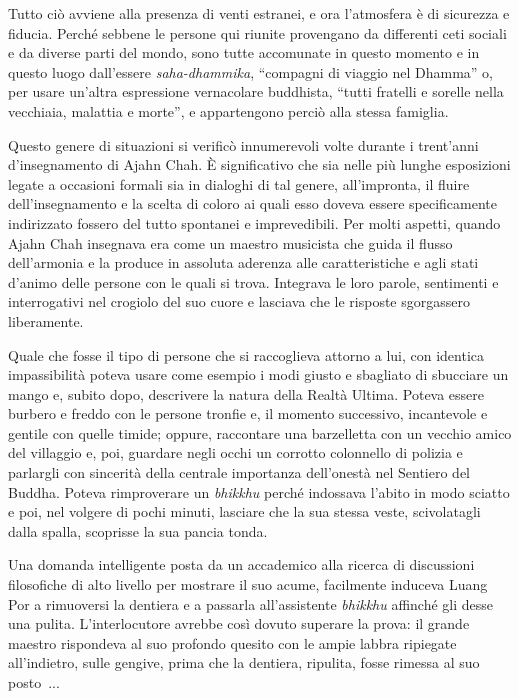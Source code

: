 Tutto ciò avviene alla presenza di venti estranei, e ora l'atmosfera è
di sicurezza e fiducia. Perché sebbene le persone qui riunite provengano
da differenti ceti sociali e da diverse parti del mondo, sono tutte
accomunate in questo momento e in questo luogo dall'essere
\emph{saha-dhammika}, ``compagni di viaggio nel Dhamma'' o, per usare
un'altra espressione vernacolare buddhista, ``tutti fratelli e sorelle
nella vecchiaia, malattia e morte'', e appartengono perciò alla stessa
famiglia.

Questo genere di situazioni si verificò innumerevoli volte durante i
trent'anni d'insegnamento di Ajahn Chah. È significativo che sia nelle
più lunghe esposizioni legate a occasioni formali sia in dialoghi di tal
genere, all'impronta, il fluire dell'insegnamento e la scelta di coloro
ai quali esso doveva essere specificamente indirizzato fossero del tutto
spontanei e imprevedibili. Per molti aspetti, quando Ajahn Chah
insegnava era come un maestro musicista che guida il flusso dell'armonia
e la produce in assoluta aderenza alle caratteristiche e agli stati
d'animo delle persone con le quali si trova. Integrava le loro parole,
sentimenti e interrogativi nel crogiolo del suo cuore e lasciava che le
risposte sgorgassero liberamente.

Quale che fosse il tipo di persone che si raccoglieva attorno a lui, con
identica impassibilità poteva usare come esempio i modi giusto e
sbagliato di sbucciare un mango e, subito dopo, descrivere la natura
della Realtà Ultima. Poteva essere burbero e freddo con le persone
tronfie e, il momento successivo, incantevole e gentile con quelle
timide; oppure, raccontare una barzelletta con un vecchio amico del
villaggio e, poi, guardare negli occhi un corrotto colonnello di polizia
e parlargli con sincerità della centrale importanza dell'onestà nel
Sentiero del Buddha. Poteva rimproverare un \emph{bhikkhu} perché
indossava l'abito in modo sciatto e poi, nel volgere di pochi minuti,
lasciare che la sua stessa veste, scivolatagli dalla spalla, scoprisse
la sua pancia tonda.

Una domanda intelligente posta da un accademico alla ricerca di
discussioni filosofiche di alto livello per mostrare il suo acume,
facilmente induceva Luang Por a rimuoversi la dentiera e a passarla
all'assistente \emph{bhikkhu} affinché gli desse una pulita.
L'interlocutore avrebbe così dovuto superare la prova: il grande maestro
rispondeva al suo profondo quesito con le ampie labbra ripiegate
all'indietro, sulle gengive, prima che la dentiera, ripulita, fosse
rimessa al suo posto~...

